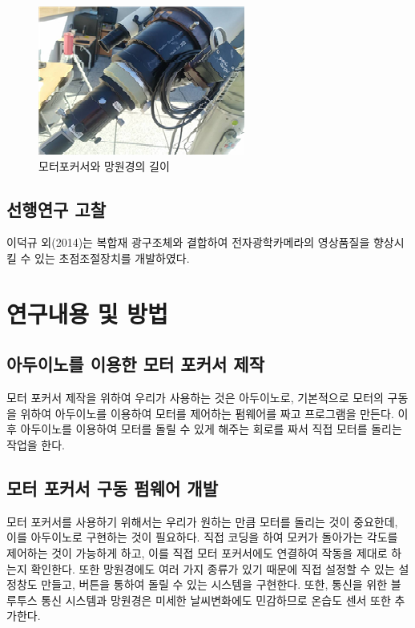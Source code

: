 \documentclass{abstract_hutech}
\begin{document}
\begin{figure}
\centering
\includegraphics[width=0.7\linewidth]{telescope3}
\caption{모터포커서와 망원경의 길이}
\label{fig:telescope3}
\end{figure}

\subsection{선행연구 고찰}
이덕규 외(2014)는 복합재 광구조체와 결합하여 전자광학카메라의 영상품질을 향상시킬 수 있는 초점조절장치를 개발하였다.\cite{leedukgu2014}
\section{연구내용 및 방법}

\subsection{아두이노를 이용한 모터 포커서 제작}

모터 포커서 제작을 위하여 우리가 사용하는 것은 아두이노로, 기본적으로 모터의 구동을 위하여 아두이노를 이용하여 모터를 제어하는 펌웨어를 짜고 프로그램을 만든다. 이후 아두이노를 이용하여 모터를 돌릴 수 있게 해주는 회로를 짜서 직접 모터를 돌리는 작업을 한다.

\subsection{모터 포커서 구동 펌웨어 개발}

모터 포커서를 사용하기 위해서는 우리가 원하는 만큼 모터를 돌리는 것이 중요한데, 이를 아두이노로 구현하는 것이 필요하다. 직접 코딩을 하여 모커가 돌아가는 각도를 제어하는 것이 가능하게 하고, 이를 직접 모터 포커서에도 연결하여 작동을 제대로 하는지 확인한다. 또한 망원경에도 여러 가지 종류가 있기 때문에 직접 설정할 수 있는 설정창도 만들고, 버튼을 통하여 돌릴 수 있는 시스템을 구현한다. 또한, 통신을 위한 블루투스 통신 시스템과 망원경은 미세한 날씨변화에도 민감하므로 온습도 센서 또한 추가한다.
\end{document}
